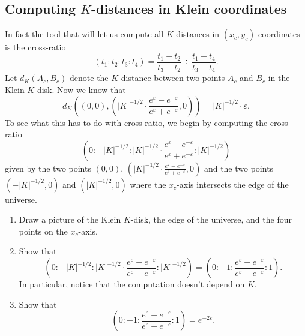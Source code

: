 \documentclass{ximera}
\begin{document}
\subsection*{Computing $K$-distances in Klein coordinates}

In fact the tool that will let us compute all $K$-distances in $\left(
x_{c},y_{c}\right)  $-coordinates is the cross-ratio 
\[
\left(  t_{1}:t_{2}:t_{3}:t_{4}\right)  =\frac{t_{1}-t_{2}}{t_{3}-t_{2}}%
\div\frac{t_{1}-t_{4}}{t_{3}-t_{4}}.
\]
Let $d_{K}\left(  A_{c},B_{c}\right)  $ denote the $K$-distance between two
points $A_{c}$ and $B_{c}$ in the Klein $K$-disk. Now we know that
\[
d_{K}\left(  \left(  0,0\right)  ,\left(  \left\vert K\right\vert
^{-1/2}\cdot \frac{e^{\varepsilon}-e^{-\varepsilon}%
}{e^{\varepsilon}+e^{-\varepsilon}},0\right)  \right)  =\left\vert
K\right\vert ^{-1/2}\cdot \varepsilon.
\]
To see what this has to do with cross-ratio, we begin by computing the cross
ratio%
\[
\left(  0:-\left\vert K\right\vert ^{-1/2}:\left\vert K\right\vert
^{-1/2}\cdot \frac{e^{\varepsilon}-e^{-\varepsilon}%
}{e^{\varepsilon}+e^{-\varepsilon}}:\left\vert K\right\vert ^{-1/2}\right)
\]
given by the two points $\left(  0,0\right)  $, $\left(  \left\vert
K\right\vert ^{-1/2}\cdot \frac{e^{\varepsilon
}-e^{-\varepsilon}}{e^{\varepsilon}+e^{-\varepsilon}},0\right)  $ and the two
points $\left(  -\left\vert K\right\vert ^{-1/2},0\right)  $ and $\left(
\left\vert K\right\vert ^{-1/2},0\right)  $ where the $x_{c}$-axis intersects
the edge of the universe.

\begin{exercise}\hfil
\begin{enumerate}
\item Draw a picture of the Klein $K$-disk, the edge of the universe,
  and the four points on the $x_{c}$-axis.
\item Show that%
\[
\left(  0:-\left\vert K\right\vert ^{-1/2}:\left\vert K\right\vert
^{-1/2}\cdot \frac{e^{\varepsilon}-e^{-\varepsilon}%
}{e^{\varepsilon}+e^{-\varepsilon}}:\left\vert K\right\vert ^{-1/2}\right)
=\left(  0:-1: \frac{e^{\varepsilon}-e^{-\varepsilon
}}{e^{\varepsilon}+e^{-\varepsilon}}:1\right)  .
\]
In particular, notice that the computation doesn't depend on $K$.

\item Show that%
\[
\left(  0:-1:\frac{e^{\varepsilon}-e^{-\varepsilon}%
}{e^{\varepsilon}+e^{-\varepsilon}}:1\right)  =e^{-2\varepsilon}.
\]
\end{enumerate}
\end{exercise}
\end{document}
